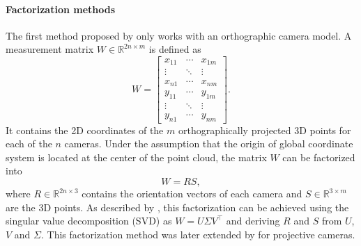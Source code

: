         	\paragraph{Factorization methods}
        		The first method proposed by \cite{tomasi1992factorization} only works with an orthographic camera model.
        		A measurement matrix $W \in \mathbb{R}^{2n \times m}$ is defined as
        		\begin{equation}
        			W =
        			\begin{bmatrix}
        			x_{11} & \cdots & x_{1m} \\ 
        			\vdots & \ddots & \vdots \\ 
        			x_{n1} & \cdots & x_{nm} \\ 
        			y_{11} & \cdots & y_{1m} \\ 
        			\vdots & \ddots  & \vdots \\ 
        			y_{n1} & \cdots & y_{nm}
        			\end{bmatrix}. 
        		\end{equation}
        		It contains the 2D coordinates of the $m$ orthographically projected 3D points for each of the $n$ cameras.
        		Under the assumption that the origin of global coordinate system is located at the center of the point cloud, the matrix $W$ can be factorized into
        		\begin{equation}
        			W = RS,
        		\end{equation}
        		where $R \in \mathbb{R}^{2n \times 3}$ contains the orientation vectors of each camera and $S \in \mathbb{R}^{3 \times m}$  are the 3D points.
        		As described by \cite{tomasi1992factorization}, this factorization can be achieved using the singular value decomposition (SVD) as $W = U \varSigma V^\top$ and deriving $R$ and $S$ from $U$, $V$ and $\varSigma$.
        		This factorization method was later extended by \cite{sturm1996factorization} for projective cameras.
        		
        		
        	
        	
        	
        
        
        
        